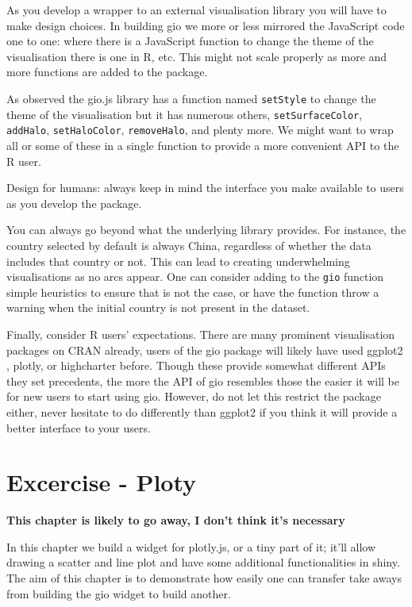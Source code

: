 \documentclass[
]{krantz}
\makeatletter
\newenvironment{kframe}{%
\medskip{}
\setlength{\fboxsep}{.8em}
 \def\at@end@of@kframe{}%
 \ifinner\ifhmode%
  \def\at@end@of@kframe{\end{minipage}}%
  \begin{minipage}{\columnwidth}%
 \fi\fi%
 \def\FrameCommand##1{\hskip\@totalleftmargin \hskip-\fboxsep
 \colorbox{shadecolor}{##1}\hskip-\fboxsep
     \hskip-\linewidth \hskip-\@totalleftmargin \hskip\columnwidth}%
 \MakeFramed {\advance\hsize-\width
   \@totalleftmargin\z@ \linewidth\hsize
   \@setminipage}}%
 {\par\unskip\endMakeFramed%
 \at@end@of@kframe}
\newenvironment{rmdblock}[1]
  {
  \begin{itemize}
  \renewcommand{\labelitemi}{
    \raisebox{-.7\height}[0pt][0pt]{
      {\setkeys{Gin}{width=3em,keepaspectratio}\texttt{[image: images/\#1]}}
    }
  }
  \setlength{\fboxsep}{1em}
  \begin{kframe}
  \item
  }
  {
  \end{kframe}
  \end{itemize}
  }
\newenvironment{rmdnote}
  {\begin{rmdblock}{note}}
  {\end{rmdblock}}
\makeatother
\begin{document}
As you develop a wrapper to an external visualisation library you will have to make design choices. In building gio we more or less mirrored the JavaScript code one to one: where there is a JavaScript function to change the theme of the visualisation there is one in R, etc. This might not scale properly as more and more functions are added to the package.

As observed the gio.js library has a function named \texttt{setStyle} to change the theme of the visualisation but it has numerous others, \texttt{setSurfaceColor}, \texttt{addHalo}, \texttt{setHaloColor}, \texttt{removeHalo}, and plenty more. We might want to wrap all or some of these in a single function to provide a more convenient API to the R user.

\begin{rmdnote}
Design for humans: always keep in mind the interface you make available
to users as you develop the package.
\end{rmdnote}

You can always go beyond what the underlying library provides. For instance, the country selected by default is always China, regardless of whether the data includes that country or not. This can lead to creating underwhelming visualisations as no arcs appear. One can consider adding to the \texttt{gio} function simple heuristics to ensure that is not the case, or have the function throw a warning when the initial country is not present in the dataset.

Finally, consider R users' expectations. There are many prominent visualisation packages on CRAN already, users of the gio package will likely have used ggplot2 \citep{R-ggplot2}, plotly, or highcharter before. Though these provide somewhat different APIs they set precedents, the more the API of gio resembles those the easier it will be for new users to start using gio. However, do not let this restrict the package either, never hesitate to do differently than ggplot2 if you think it will provide a better interface to your users.

\hypertarget{widgets-ex-plotly}{%
\chapter{Excercise - Ploty}\label{widgets-ex-plotly}}

\textbf{This chapter is likely to go away, I don't think it's necessary}

In this chapter we build a widget for plotly.js, or a tiny part of it; it'll allow drawing a scatter and line plot and have some additional functionalities in shiny. The aim of this chapter is to demonstrate how easily one can transfer take aways from building the gio widget to build another.
\end{document}
